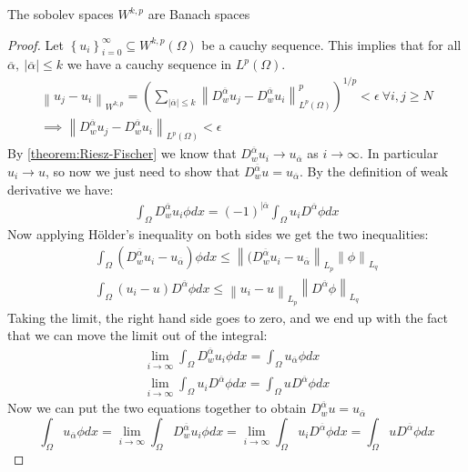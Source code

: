 \documentclass[../Main/main.tex]{subfiles}
\begin{document}
	
	\begin{theorem}
		The sobolev spaces $W^{k,p}$ are Banach spaces
	\end{theorem}
	
	\begin{proof}
		Let $\left \{  u_i\right \}_{i=0}^{\infty} \subseteq W^{k,p}(\Omega)$ be a cauchy sequence. This implies that for all $\overline{\alpha}, \  |\overline{\alpha}| \leq k$ we have a cauchy sequence in $L^p(\Omega)$.
		\begin{gather*}
			\left \| u_j -u_i \right \|_{W^{k,p}} =
			(\sum_{|\overline{\alpha}|\leq k} \left \| D_w^{\overline{\alpha}}u_j - D_w^{\overline{\alpha}}u_i \right \|_{L^p(\Omega)}^p)^{1/p}  < \epsilon \ \forall i,j \geq N \\
			\implies \left \| D_w^{\overline{\alpha}}u_j - D_w^{\overline{\alpha}}u_i \right \|_{L^p(\Omega)} < \epsilon
		\end{gather*}
		By \eqref{theorem:Riesz-Fischer} we know that $D_w^{\overline{\alpha}}u_i \rightarrow u_{\overline{\alpha}}$ as $i\rightarrow  \infty$. In particular $u_i \rightarrow u$, so now we just need to show that $D_w^{\overline{\alpha}}u =  u_{\overline{\alpha}}$. By the definition of weak derivative we have:
		\begin{gather*}
			\int_{\Omega} D_w^{\overline{\alpha}}u_i \phi dx = (-1)^{|\overline{\alpha}} \int_{\Omega} u_i D^{\overline{\alpha}}\phi dx
		\end{gather*}
		Now applying Hölder's inequality on both sides we get the two inequalities:
		\begin{gather*}
			\int_{\Omega} (D_w^{\overline{\alpha}}u_i - u_{\overline{\alpha}}) \phi dx \leq \left \| (D_w^{\overline{\alpha}}u_i - u_{\overline{\alpha}} \right \|_{L_p} \left \| \phi \right \|_{L_q} \\
			\int_{\Omega} (u_i -u) D^{\overline{\alpha}}\phi dx \leq \left \|u_i -u  \right \|_{L_p} \left \| D^{\overline{\alpha}}\phi \right \|_{L_q}
		\end{gather*}
		Taking the limit, the right hand side goes to zero, and we end up with the fact that we can move the limit out of the integral:
		\begin{gather*}
			\lim_{i\rightarrow \infty} \int_{\Omega} D_w^{\overline{\alpha}}u_i \phi dx =  \int_{\Omega}u_{\overline{\alpha}} \phi dx \\
			\lim_{i\rightarrow \infty}\int_{\Omega} u_i D^{\overline{\alpha}}\phi dx = \int_{\Omega} u  D^{\overline{\alpha}}\phi dx
		\end{gather*}
		Now we can put the two equations together to obtain $D_w^{\overline{\alpha}}u =  u_{\overline{\alpha}}$
		\begin{equation*}
			\int_{\Omega}u_{\overline{\alpha}} \phi dx = \lim_{i\rightarrow \infty} \int_{\Omega} D_w^{\overline{\alpha}}u_i \phi dx = \lim_{i\rightarrow \infty}\int_{\Omega} u_i D^{\overline{\alpha}}\phi dx = \int_{\Omega} u  D^{\overline{\alpha}}\phi dx
		\end{equation*}
	\end{proof}
\end{document}
